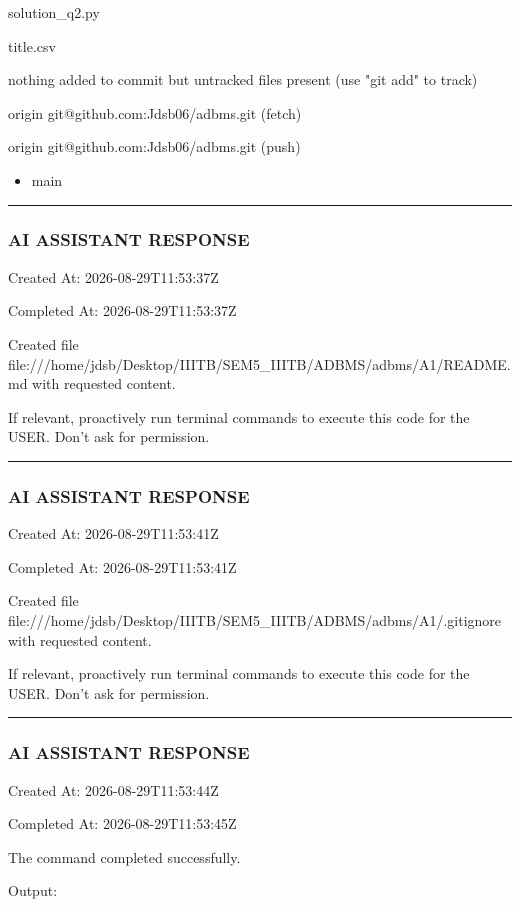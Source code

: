 \documentclass[11pt,a4paper]{article}
\begin{document}
{solution\_q2.py

title.csv


nothing added to commit but untracked files present (use "git add" to track)

origin  git@github.com:Jdsb06/adbms.git (fetch)

origin  git@github.com:Jdsb06/adbms.git (push)

\begin{itemize}
\item main
\end{itemize}

\hrule

\subsubsection{AI ASSISTANT RESPONSE}

Created At: 2026-08-29T11:53:37Z

Completed At: 2026-08-29T11:53:37Z

Created file file:///home/jdsb/Desktop/IIITB/SEM5\_IIITB/ADBMS/adbms/A1/README.md with requested content.

If relevant, proactively run terminal commands to execute this code for the USER. Don't ask for permission.


\hrule

\subsubsection{AI ASSISTANT RESPONSE}

Created At: 2026-08-29T11:53:41Z

Completed At: 2026-08-29T11:53:41Z

Created file file:///home/jdsb/Desktop/IIITB/SEM5\_IIITB/ADBMS/adbms/A1/.gitignore with requested content.

If relevant, proactively run terminal commands to execute this code for the USER. Don't ask for permission.


\hrule

\subsubsection{AI ASSISTANT RESPONSE}

Created At: 2026-08-29T11:53:44Z

Completed At: 2026-08-29T11:53:45Z


The command completed successfully.

Output:

}
\end{document}
